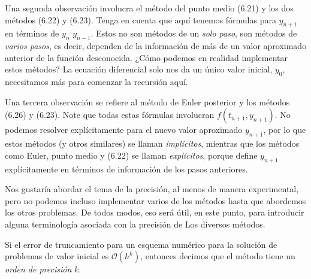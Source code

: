 Una segunda observación involucra el método del punto medio (6.21) y los dos métodos (6.22) y (6.23). Tenga en cuenta que aquí tenemos fórmulas para $y_{n+1}$ en términos de $y_{n}$ $y_{n-1}$. Estos no son métodos de un \emph{solo paso}, son métodos de \emph{varios pasos}, es decir, dependen de la información de más de un valor aproximado anterior de la función desconocida. ¿Cómo podemos en realidad implementar estos métodos? La ecuación diferencial solo nos da un único valor inicial, $y_{0}$, necesitamos más para comenzar la recursión aquí.


Una tercera observación se refiere al método de Euler posterior y los métodos (6.26) y (6.23). Note que todas estas fórmulas involucran $f\left(t_{n+1},y_{n+1}\right)$. No podemos resolver explícitamente para el nuevo valor aproximado $y_{n+1}$, por lo que estos métodos (y otros similares) se llaman \emph{implícitos}, mientras que los métodos como Euler, punto medio y (6.22) se llaman \emph{explícitos}, porque define $y_{n+1}$ explícitamente en términos de información de los pasos anteriores.


Nos gustaría abordar el tema de la precisión, al menos de manera experimental, pero no podemos incluso implementar varios de los métodos hasta que abordemos los otros problemas. De todos modos, eso será útil, en este punto, para introducir alguna terminología asociada con la precisión de Los diversos métodos.

\begin{definition}
Si el error de truncamiento para un esquema numérico para la solución de problemas de valor inicial es $\mathcal{O}\left(h^{k}\right)$, entonces decimos que el método tiene un \emph{orden de precisión} $k$.
\end{definition}


